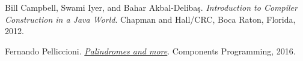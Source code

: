 \documentclass[11pt]{article}
\begin{document}

\begin{thebibliography}{9}
	Bill Campbell, Swami Iyer, and Bahar Akbal-Deliba\c s.
	\textit{Introduction to Compiler Construction in a Java World}.
	Chapman and Hall/CRC, Boca Raton, Florida, 2012.
	
	Fernando Pelliccioni.
	\href{http://componentsprogramming.com/palindromes/}{\textit{Palindromes and more}}.
	Components Programming, 2016.
\end{thebibliography}
\end{document}
